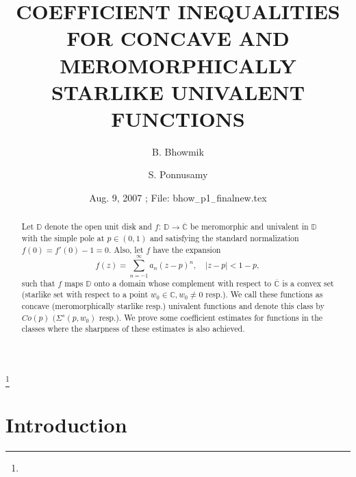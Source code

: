\documentclass[leqno,
12pt]{amsart}
\theoremstyle{definition}
\begin{document}

\title{COEFFICIENT INEQUALITIES FOR
CONCAVE AND MEROMORPHICALLY STARLIKE UNIVALENT FUNCTIONS}
\author{B. Bhowmik}
\address{B. Bhowmik, Department of Mathematics,
Indian Institute of Technology Madras, Chennai-600 036, India.}
\author{S. Ponnusamy}
\address{S. Ponnusamy, Department of Mathematics,
Indian Institute of Technology Madras, Chennai-600 036, India.}

\date{
Aug. 9, 2007
; File: bhow${}_{-}$p1${}_{-}$finalnew.tex}

\begin{abstract}
Let ${{\mathbb D}}$ denote the open unit disk and $f:\,{{\mathbb D}}\rightarrow\overline{{\mathbb C}}$ be meromorphic
and univalent in ${{\mathbb D}}$ with the simple pole at $p\in (0,1)$
and satisfying the standard normalization $f(0)=f'(0)-1=0$. Also, let $f$ have the
expansion
$$f(z)=\sum_{n=-1}^{\infty}a_n(z-p)^n,\quad |z-p|<1-p,
$$
such that $f$ maps ${{\mathbb D}}$ onto a domain whose complement with respect to
$\overline{{\mathbb C}}$ is a convex set (starlike set with respect to a point
$w_0\in {{\mathbb C}}, w_0\neq 0$ resp.).
We call these functions as concave (meromorphically starlike resp.)
univalent functions and denote this class by $Co(p)$ $(\Sigma^s(p, w_0)$ resp.).
We prove some coefficient estimates for functions in the classes where
the sharpness of these estimates is also achieved.
\end{abstract}
\baselineskip=16pt
\thanks{}

\maketitle
\pagestyle{myheadings}

\section{Introduction}\label{sec1-bpw2}
\end{document}
